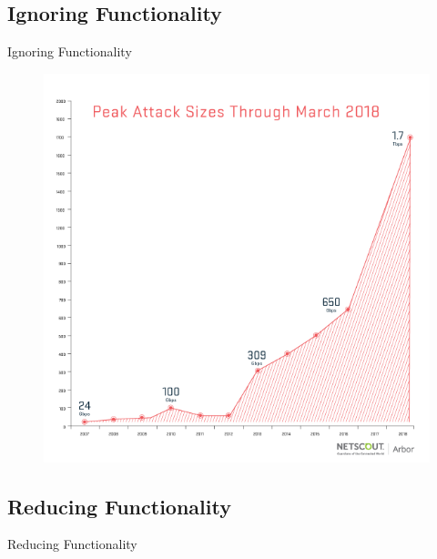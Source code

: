 \documentclass[11pt,t,usepdftitle=false,aspectratio=169]{beamer}
\begin{document}
\subsection{Ignoring Functionality}
\begin{frame}{Ignoring Functionality}


	\pause{}
	\begin{figure}
		\centering
		\includegraphics[keepaspectratio,height=.85 \paperheight]{img/DDoS_growth}
	\end{figure}
\end{frame}

\subsection{Reducing Functionality}
\begin{frame}{Reducing Functionality}

\end{frame}
\end{document}
